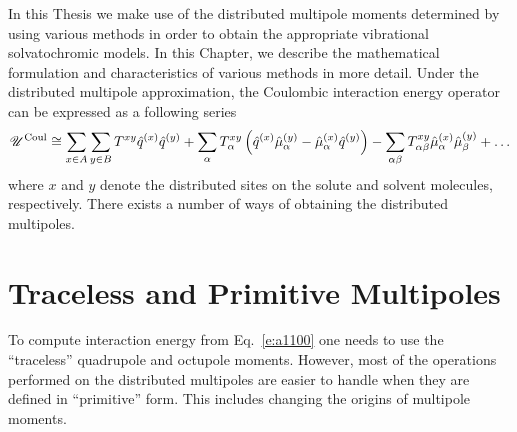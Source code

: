 \documentclass[a4paper,titlepage,twoside,fleqn,12pt]{book}
\begin{document}
\begin{appendices}
\begin{refsection}
In this Thesis we make use of the distributed multipole 
moments determined by using various methods in order to obtain
the appropriate vibrational solvatochromic models. In this Chapter,
we describe the mathematical formulation and characteristics of various methods
in more detail.
Under the distributed multipole approximation, the Coulombic
interaction energy operator can be expressed as a following series \citep{Stone.TheTheoryOfIntermolecularForces.1996}
%
\begin{equation} \label{e:a1100}
 \mathscr{U}^{\rm Coul} \cong \sum_{x\in A}\sum_{y\in B}  T^{xy}\hat{q}^{(x)}\hat{q}^{(y)} + 
\sum_\alpha T^{xy}_\alpha \left( \hat{q}^{(x)} \hat{\mu}^{(y)}_\alpha - \hat{\mu}^{(x)}_\alpha \hat{q}^{(y)}\right)
 - \sum_{\alpha\beta} T^{xy}_{\alpha\beta} \hat{\mu}^{(x)}_\alpha \hat{\mu}^{(y)}_\beta + \ldots
\end{equation}
%
where $x$ and $y$ denote the distributed sites on the solute and solvent
molecules, respectively. There exists a number of ways of obtaining
the distributed multipoles. 

\section{Traceless and Primitive Multipoles}

To compute interaction energy from Eq.~\eqref{e:a1100} one needs 
to use the ``traceless'' quadrupole and octupole moments. However, 
most of the operations performed on the distributed multipoles
are easier to handle when they are defined in ``primitive'' form.
This includes changing the origins of multipole moments.


\end{refsection}
\end{appendices}
\end{document}
